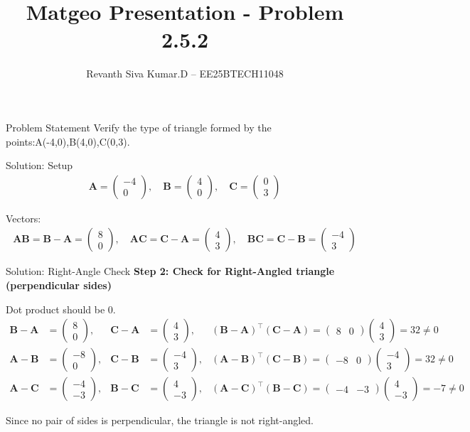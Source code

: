 \documentclass{beamer}
\title{Matgeo Presentation - Problem 2.5.2}
\author{Revanth Siva Kumar.D -- EE25BTECH11048}
\numberwithin{equation}{section}
\newcommand{\myvec}[1]{\ensuremath{\begin{pmatrix}#1\end{pmatrix}}}
\let\vec\mathbf
\begin{document}
\begin{frame}
\titlepage
\end{frame}

\begin{frame}{Problem Statement}
Verify the type of triangle formed by the points:A(-4,0),B(4,0),C(0,3).
\end{frame}

\begin{frame}{Solution: Setup}
\begin{align*}
    \vec{A}=\myvec{-4\\0},\quad
\vec{B}=\myvec{4\\0},\quad
\vec{C}=\myvec{0\\3}
\end{align*}


Vectors:
\begin{align*}
    \vec{AB}=\vec{B}-\vec{A}=\myvec{8\\0},\quad
\vec{AC}=\vec{C}-\vec{A}=\myvec{4\\3},\quad
\vec{BC}=\vec{C}-\vec{B}=\myvec{-4\\3}
\end{align*}
\end{frame}

\begin{frame}{Solution: Right-Angle Check}
\textbf{Step 2: Check for Right-Angled triangle (perpendicular sides)}

Dot product should be 0.
\small
\begin{align}
\vec{B}-\vec{A} &= \myvec{8\\0}, &
\vec{C}-\vec{A} &= \myvec{4\\3}, &
(\vec{B}-\vec{A})^\top (\vec{C}-\vec{A}) = \myvec{8&0}\myvec{4\\3} = 32 \neq 0 \\
\vec{A}-\vec{B} &= \myvec{-8\\0}, &
\vec{C}-\vec{B} &= \myvec{-4\\3}, &
(\vec{A}-\vec{B})^\top (\vec{C}-\vec{B}) = \myvec{-8&0}\myvec{-4\\3} = 32 \neq 0 \\
\vec{A}-\vec{C} &= \myvec{-4\\-3}, &
\vec{B}-\vec{C} &= \myvec{4\\-3}, &
(\vec{A}-\vec{C})^\top (\vec{B}-\vec{C}) = \myvec{-4&-3}\myvec{4\\-3} = -7 \neq 0
\end{align}

Since no pair of sides is perpendicular, the triangle is not right-angled.
\end{frame}
\end{document}
